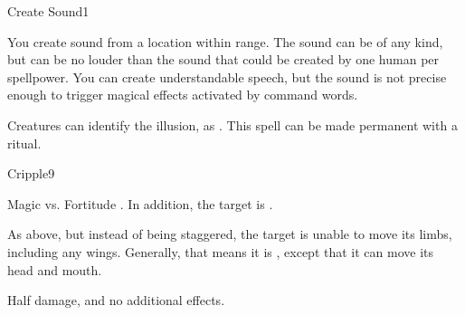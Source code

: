 \begin{spellsection}{Create Sound}{1}
    \begin{spellheader}
    \end{spellheader}
    \begin{spellcontent}
        \begin{spelltargetinginfo}
            \spellrng{\rngmed}
        \end{spelltargetinginfo}
        \begin{spelleffects}
            \spelleffect You create sound from a location within range. The sound can be of any kind, but can be no louder than the sound that could be created by one human per spellpower. You can create understandable speech, but the sound is not precise enough to trigger magical effects activated by command words.
            \spelldur \durshort \dismissable
        \end{spelleffects}
    \end{spellcontent}
    \begin{spellfooter}
        \spellnotes Creatures can identify the illusion, as . This spell can be made permanent with a  ritual.
        \miscastexplode
    \end{spellfooter}
\end{spellsection}

\begin{spellsection}{Cripple}{9}
    \begin{spellheader}
    \end{spellheader}
    \begin{spellcontent}
        \begin{spelltargetinginfo}
        \end{spelltargetinginfo}
        \begin{spelleffects}
            \begin{spellattack}{Magic vs. Fortitude}
                \spellsuccess {}. In addition, the target is \staggered.

                \spellcritical As above, but instead of being staggered, the target is unable to move its limbs, including any wings. Generally, that means it is \paralyzed, except that it can move its head and mouth.

                \spellfailure Half damage, and no additional effects.
            \end{spellattack}
            \spelldur \durshort
        \end{spelleffects}
    \end{spellcontent}
    \begin{spellfooter}
        \miscastrandom
    \end{spellfooter}
\end{spellsection}

